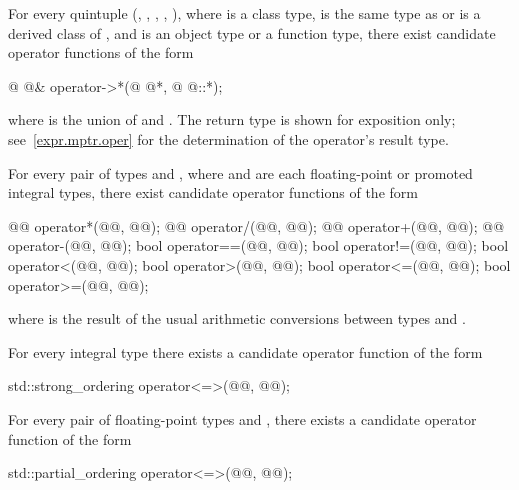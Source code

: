 \pnum
For every quintuple
(,
,
,
,
),
where
is a class type,
is the same type as  or is a derived class of , and
is an object type or a function type,
there exist candidate operator functions of the form
\begin{codeblock}
@ @& operator->*(@ @*, @ @::*);
\end{codeblock}
where  is the union of  and .
The return type is shown for exposition only; see~\ref{expr.mptr.oper} for the
determination of the operator's result type.

\pnum
For every pair of types  and ,
where  and  are each
floating-point or promoted integral types,
there exist candidate operator functions of the form
\begin{codeblock}
@@      operator*(@@, @@);
@@      operator/(@@, @@);
@@      operator+(@@, @@);
@@      operator-(@@, @@);
bool    operator==(@@, @@);
bool    operator!=(@@, @@);
bool    operator<(@@, @@);
bool    operator>(@@, @@);
bool    operator<=(@@, @@);
bool    operator>=(@@, @@);
\end{codeblock}
where
is the result of the usual arithmetic conversions between types
and
.

\pnum
For every integral type 
there exists a candidate operator function of the form
\begin{codeblock}
std::strong_ordering operator<=>(@@, @@);
\end{codeblock}

\pnum
For every pair of floating-point types
 and ,
there exists a candidate operator function of the form
\begin{codeblock}
std::partial_ordering operator<=>(@@, @@);
\end{codeblock}

